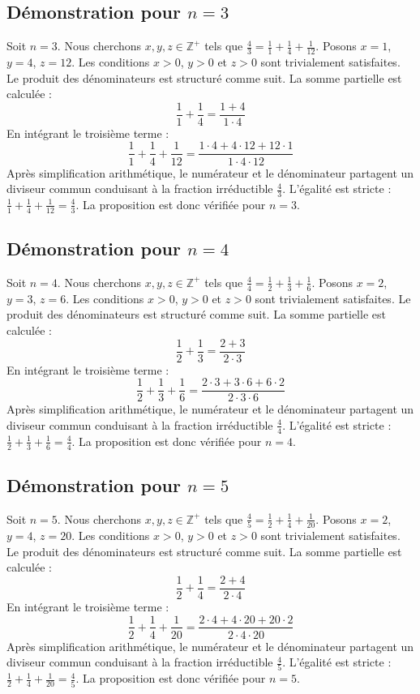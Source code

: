 \documentclass[11pt,a4paper]{article}
\begin{document}
\subsection{Démonstration pour $n = 3$}
Soit $n = 3$. Nous cherchons $x, y, z \in \mathbb{Z}^{+}$ tels que $\frac{4}{3} = \frac{1}{1} + \frac{1}{4} + \frac{1}{12}$.
Posons $x = 1$, $y = 4$, $z = 12$.
Les conditions $x > 0$, $y > 0$ et $z > 0$ sont trivialement satisfaites.
Le produit des dénominateurs est structuré comme suit. La somme partielle est calculée :
$$ \frac{1}{1} + \frac{1}{4} = \frac{1+4}{1 \cdot 4} $$
En intégrant le troisième terme :
$$ \frac{1}{1} + \frac{1}{4} + \frac{1}{12} = \frac{1 \cdot 4 + 4 \cdot 12 + 12 \cdot 1}{1 \cdot 4 \cdot 12} $$
Après simplification arithmétique, le numérateur et le dénominateur partagent un diviseur commun conduisant à la fraction irréductible $\frac{4}{3}$.
L'égalité est stricte : $\frac{1}{1} + \frac{1}{4} + \frac{1}{12} = \frac{4}{3}$.
La proposition est donc vérifiée pour $n = 3$.
\subsection{Démonstration pour $n = 4$}
Soit $n = 4$. Nous cherchons $x, y, z \in \mathbb{Z}^{+}$ tels que $\frac{4}{4} = \frac{1}{2} + \frac{1}{3} + \frac{1}{6}$.
Posons $x = 2$, $y = 3$, $z = 6$.
Les conditions $x > 0$, $y > 0$ et $z > 0$ sont trivialement satisfaites.
Le produit des dénominateurs est structuré comme suit. La somme partielle est calculée :
$$ \frac{1}{2} + \frac{1}{3} = \frac{2+3}{2 \cdot 3} $$
En intégrant le troisième terme :
$$ \frac{1}{2} + \frac{1}{3} + \frac{1}{6} = \frac{2 \cdot 3 + 3 \cdot 6 + 6 \cdot 2}{2 \cdot 3 \cdot 6} $$
Après simplification arithmétique, le numérateur et le dénominateur partagent un diviseur commun conduisant à la fraction irréductible $\frac{4}{4}$.
L'égalité est stricte : $\frac{1}{2} + \frac{1}{3} + \frac{1}{6} = \frac{4}{4}$.
La proposition est donc vérifiée pour $n = 4$.
\subsection{Démonstration pour $n = 5$}
Soit $n = 5$. Nous cherchons $x, y, z \in \mathbb{Z}^{+}$ tels que $\frac{4}{5} = \frac{1}{2} + \frac{1}{4} + \frac{1}{20}$.
Posons $x = 2$, $y = 4$, $z = 20$.
Les conditions $x > 0$, $y > 0$ et $z > 0$ sont trivialement satisfaites.
Le produit des dénominateurs est structuré comme suit. La somme partielle est calculée :
$$ \frac{1}{2} + \frac{1}{4} = \frac{2+4}{2 \cdot 4} $$
En intégrant le troisième terme :
$$ \frac{1}{2} + \frac{1}{4} + \frac{1}{20} = \frac{2 \cdot 4 + 4 \cdot 20 + 20 \cdot 2}{2 \cdot 4 \cdot 20} $$
Après simplification arithmétique, le numérateur et le dénominateur partagent un diviseur commun conduisant à la fraction irréductible $\frac{4}{5}$.
L'égalité est stricte : $\frac{1}{2} + \frac{1}{4} + \frac{1}{20} = \frac{4}{5}$.
La proposition est donc vérifiée pour $n = 5$.
\end{document}
